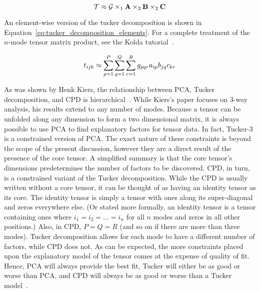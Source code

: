 \documentclass[../dissertation.tex]{subfiles}
\begin{document}
\begin{equation}\label{eq:tucker_decomposition}
  \mathcal{T} \approx \mathcal{G} \times_1 \mathrm{\bf A} \times_2 \mathrm{\bf B} \times_2
  \mathrm{\bf C}
\end{equation}

An element-wise version of the tucker decomposition is shown in
Equation~\ref{eq:tucker_decomposition_elements}.  For a complete
treatment of the $n$-mode tensor matrix product, see the Kolda
tutorial~\cite{kolda2009}.

\begin{equation}\label{eq:tucker_decomposition_elements}
  t_{ijk} \approx \displaystyle\sum_{p=1}^P \displaystyle\sum_{q=1}^Q \displaystyle\sum_{r=1}^R
  g_{pqr}a_{ip}b_{jq}c_{kr}
\end{equation}

As was shown by Henk Kiers, the relationship between PCA, Tucker
decomposition, and CPD is hierarchical~\cite{kiers1991}.  While
Kiers's paper focuses on 3-way analysis, his results extend to any
number of modes.  Because a tensor can be unfolded along any dimension
to form a two dimensional matrix, it is always possible to use PCA to
find explanatory factors for tensor data.  In fact, Tucker-3 is a
constrained version of PCA.  The exact nature of these constraints is
beyond the scope of the present discussion, however they are a direct
result of the presence of the core tensor.  A simplified summary is
that the core tensor's dimensions predetermines the number of
factors to be discovered.  CPD, in turn, is a constrained variant of
the Tucker decomposition.  While the CPD is usually written without a
core tensor, it can be thought of as having an identity tensor as its
core.  The identity tensor is simply a tensor with ones along its
super-diagonal and zeros everywhere else.  (Or stated more formally,
an identity tensor is a tensor containing ones where $i_1 = i_2 =
\ldots =i_n$ for all $n$ modes and zeros in all other positions.)
Also, in CPD, $P=Q=R$ (and so on if there are more than three modes).
Tucker decomposition allows for each mode to have a different number
of factors, while CPD does not.  As can be expected, the more
constraints placed upon the explanatory model of the tensor comes at
the expense of quality of fit.  Hence, PCA will always provide the
best fit, Tucker will either be as good or worse than PCA, and CPD
will always be as good or worse than a Tucker model~\cite{kiers1991,
  bro1997}.
\end{document}
